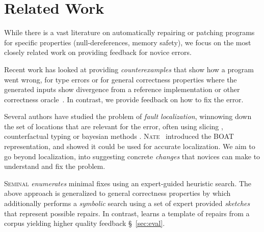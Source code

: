 \section{Related Work}
\label{sec:related-work}

While there is a vast literature on automatically repairing or patching programs
for specific properties (\eg null-dereferences, memory safety), we focus on the
most closely related work on providing feedback for novice errors.

%
Recent work has looked at providing \emph{counterexamples} that show how a
program went wrong, for type errors \cite{Seidel2016-ul} or for general
correctness properties where the generated inputs show divergence from a
reference implementation or other correctness oracle~\cite{Song_2019}. In
contrast, we provide feedback on how to fix the error.

 Several authors have studied the problem of
\emph{fault localization}, \ie winnowing down the set of locations that are
relevant for the error, often using slicing
\citep{Wand1986-nw,Haack2003-vc,Tip2001-qp,Rahli2015-tt}, counterfactual typing
\citep{Chen2014-gd} or bayesian methods \citep{Zhang2014-lv}.
%
\textsc{Nate}~\citep{Seidel:2017} introduced the BOAT representation,
and showed it could be used for accurate localization.
%
We aim to go beyond localization, into suggesting concrete \emph{changes} that
novices can make to understand and fix the problem.

%
\textsc{Seminal} \citep{Lerner2007-dt} \emph{enumerates} minimal fixes using an
expert-guided heuristic search.
%
The above approach is generalized to general correctness properties by
\cite{singh2013} which additionally performs a \emph{symbolic} search using a
set of expert provided \emph{sketches} that represent possible repairs.
%
In contrast, \toolname learns a template of repairs from a corpus yielding
higher quality feedback \S~\ref{sec:eval}.

